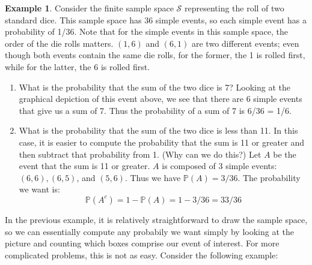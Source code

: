 \documentclass[12pt]{article}
\theoremstyle{definition}
\newtheorem*{example}{Example}
\theoremstyle{remark}
\def\P{{\mathbb P}}
\def\cals{{\mathcal S}}
\begin{document}
\begin{example}Consider the finite sample space $\cals$ representing the roll of two standard dice. This sample space has 36 simple events, so each simple event has a probability of 1/36. Note that for the simple events in this sample space, the order of the die rolls matters. $(1, 6)$ and $(6, 1)$ are two different events; even though both events contain the same die rolls, for the former, the 1 is rolled first, while for the latter, the 6 is rolled first.
\begin{enumerate}
\item What is the probability that the sum of the two dice is 7? Looking at the graphical depiction of this event above, we see that there are 6 simple events that give us a sum of 7. Thus the probability of a sum of 7 is 6/36 = 1/6.
\item What is the probability that the sum of the two dice is less than 11. In this case, it is easier to compute the probability that the sum is 11 or greater and then subtract that probability from 1. (Why can we do this?) Let $A$ be the event that the sum is 11 or greater. $A$ is composed of 3 simple events: $(6, 6), (6, 5)$, and $(5, 6)$. Thus we have $\P(A) = 3/36$. The probability we want is:
\[
\P(A^c) = 1 - \P(A) = 1 - 3/36 = 33/36
\]
\end{enumerate}
\end{example}
In the previous example, it is relatively straightforward to draw the sample space, so we can essentially compute any probabily we want simply by looking at the picture and counting which boxes comprise our event of interest. For more complicated problems, this is not as easy. Consider the following example:
\end{document}
